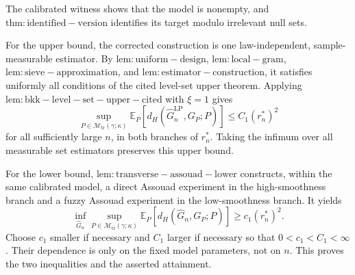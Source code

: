 The calibrated witness shows that the model is nonempty, and \(\mathrm{thm:identified-version}\) identifies its target modulo irrelevant null sets.

For the upper bound, the corrected construction is one law-independent, sample-measurable estimator. By \(\mathrm{lem:uniform-design}\), \(\mathrm{lem:local-gram}\), \(\mathrm{lem:sieve-approximation}\), and \(\mathrm{lem:estimator-construction}\), it satisfies uniformly all conditions of the cited level-set upper theorem. Applying \(\mathrm{lem:bkk-level-set-upper-cited}\) with \(\xi=1\) gives
\[
\sup_{P\in\mathcal M_{\mathrm{tr}}(\gamma;\kappa)}
\mathbb E_P[d_H(\widehat G_n^{\mathrm{LP}},G_P;P)]
\le C_1(r_n^*)^2
\]
for all sufficiently large \(n\), in both branches of \(r_n^*\). Taking the infimum over all measurable set estimators preserves this upper bound.

For the lower bound, \(\mathrm{lem:transverse-assouad-lower}\) constructs, within the same calibrated model, a direct Assouad experiment in the high-smoothness branch and a fuzzy Assouad experiment in the low-smoothness branch. It yields
\[
\inf_{\widehat G_n}\sup_{P\in\mathcal M_{\mathrm{tr}}(\gamma;\kappa)}
\mathbb E_P[d_H(\widehat G_n,G_P;P)]
\ge c_1(r_n^*)^2.
\]
Choose \(c_1\) smaller if necessary and \(C_1\) larger if necessary so that \(0<c_1<C_1<\infty\). Their dependence is only on the fixed model parameters, not on \(n\). This proves the two inequalities and the asserted attainment.